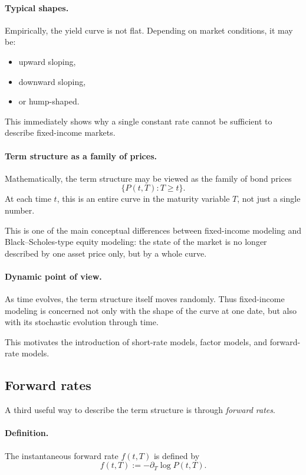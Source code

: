 \documentclass[11pt]{article}
\theoremstyle{plain}
\theoremstyle{definition}
\theoremstyle{remark}
\begin{document}
\paragraph{Typical shapes.}
Empirically, the yield curve is not flat.
Depending on market conditions, it may be:
\begin{itemize}[leftmargin=1.4em]
    \item upward sloping,
    \item downward sloping,
    \item or hump-shaped.
\end{itemize}

This immediately shows why a single constant rate cannot be sufficient
to describe fixed-income markets.

\paragraph{Term structure as a family of prices.}
Mathematically, the term structure may be viewed as the family of bond
prices
\[
\{P(t,T):T\ge t\}.
\]
At each time \(t\), this is an entire curve in the maturity variable
\(T\), not just a single number.

This is one of the main conceptual differences between fixed-income
modeling and Black--Scholes-type equity modeling:
the state of the market is no longer described by one asset price only,
but by a whole curve.

\paragraph{Dynamic point of view.}
As time evolves, the term structure itself moves randomly.
Thus fixed-income modeling is concerned not only with the shape of the
curve at one date, but also with its stochastic evolution through time.

This motivates the introduction of short-rate models, factor models, and
forward-rate models.

\subsection{Forward rates}

A third useful way to describe the term structure is through
\emph{forward rates}.

\paragraph{Definition.}
The instantaneous forward rate \(f(t,T)\) is defined by
\[
\boxed{
f(t,T):=-\partial_T \log P(t,T).
}
\]
\end{document}
